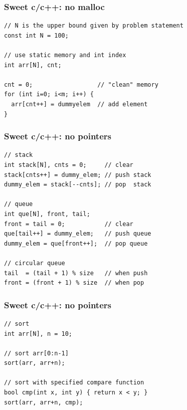 \documentclass{beamer}
\begin{document}
\begin{frame}[fragile]
  \frametitle{Sweet c/c++: no malloc}
\begin{verbatim}
// N is the upper bound given by problem statement
const int N = 100;

// use static memory and int index
int arr[N], cnt;

cnt = 0;                  // "clean" memory
for (int i=0; i<m; i++) {
  arr[cnt++] = dummyelem  // add element
}
\end{verbatim}
\end{frame}

\begin{frame}[fragile]
  \frametitle{Sweet c/c++: no pointers}
\begin{verbatim}
// stack  
int stack[N], cnts = 0;     // clear
stack[cnts++] = dummy_elem; // push stack
dummy_elem = stack[--cnts]; // pop  stack

// queue
int que[N], front, tail;
front = tail = 0;           // clear
que[tail++] = dummy_elem;   // push queue
dummy_elem = que[front++];  // pop queue

// circular queue
tail  = (tail + 1) % size   // when push
front = (front + 1) % size  // when pop
\end{verbatim}
\end{frame}

\begin{frame}[fragile]
  \frametitle{Sweet c/c++: no pointers}
\begin{verbatim}
// sort
int arr[N], n = 10;

// sort arr[0:n-1]
sort(arr, arr+n);

// sort with specified compare function
bool cmp(int x, int y) { return x < y; }
sort(arr, arr+n, cmp);
\end{verbatim}
\end{frame}
\end{document}
